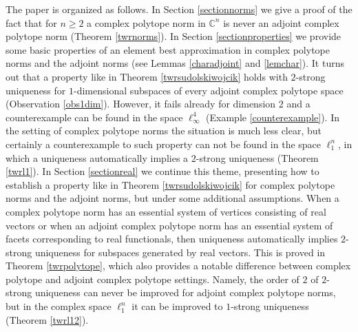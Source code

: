 \documentclass[12pt, reqno]{amsart}
\theoremstyle{definition}
\theoremstyle{remark}
\numberwithin{equation}{section}
\begin{document}
The paper is organized as follows. In Section \ref{sectionnorms} we give a proof of the fact that for $n \geq 2$ a complex polytope norm in $\mathbb{C}^n$ is never an adjoint complex polytope norm (Theorem \ref{twrnorms}). In Section \ref{sectionproperties} we provide some basic properties of an element best approximation in complex polytope norms and the adjoint norms (see Lemmas \ref{charadjoint} and \ref{lemchar}). It turns out that a property like in Theorem \ref{twrsudolskiwojcik} holds with $2$-strong uniqueness for $1$-dimensional subspaces of every adjoint complex polytope space (Observation \ref{obs1dim}). However, it fails already for dimension $2$ and a counterexample can be found in the space $\ell_{\infty}^4$ (Example \ref{counterexample}). In the setting of complex polytope norms the situation is much less clear, but certainly a counterexample to such property can not be found in the space $\ell_1^n$, in which a uniqueness automatically implies a $2$-strong uniqueness (Theorem \ref{twrl1}). In Section \ref{sectionreal} we continue this theme, presenting how to establish a property like in Theorem \ref{twrsudolskiwojcik} for complex polytope norms and the adjoint norms, but under some additional assumptions. When a complex polytope norm has an essential system of vertices consisting of real vectors or when an adjoint complex polytope norm has an essential system of facets corresponding to real functionals, then uniqueness automatically implies $2$-strong uniqueness for subspaces generated by real vectors. This is proved in Theorem \ref{twrpolytope}, which also provides a notable difference between complex polytope and adjoint complex polytope settings. Namely, the order of $2$ of $2$-strong uniqueness can never be improved for adjoint complex polytope norms, but in the complex space $\ell_1^n$ it can be improved to $1$-strong uniqueness (Theorem \ref{twrl12}).
\end{document}
